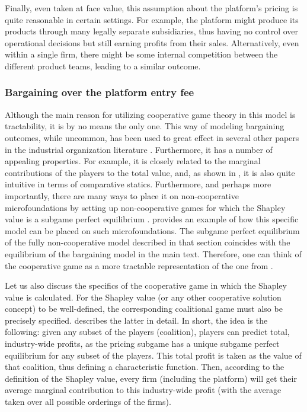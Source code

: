 Finally, even taken at face value, this assumption about the platform's pricing is quite reasonable in certain settings.
For example, the platform might produce its products through many legally separate subsidiaries, thus having no control over operational decisions but still earning profits from their sales.
Alternatively, even within a single firm, there might be some internal competition between the different product teams, leading to a similar outcome.

\subsubsection{Bargaining over the platform entry fee}

Although the main reason for utilizing cooperative game theory in this model is tractability, it is by no means the only one.
This way of modeling bargaining outcomes, while uncommon, has been used to great effect in several other papers in the industrial organization literature \parencite[e.g.][]{montez2007downstream,hart1990property,levy1997individual,inderst2003bargaining,brugemann2019intra}.
Furthermore, it has a number of appealing properties.
For example, it is closely related to the marginal contributions of the players to the total value, and, as shown in , it is also quite intuitive in terms of comparative statics.
Furthermore, and perhaps more importantly, there are many ways to place it on non-cooperative microfoundations by setting up non-cooperative games for which the Shapley value is a subgame perfect equilibrium \parencite[e.g.][]{gul1989bargaining,hart1996bargaining,stole1996organizational}.
 provides an example of how this specific model can be placed on such microfoundations.
The subgame perfect equilibrium of the fully non-cooperative model described in that section coincides with the equilibrium of the bargaining model in the main text.
Therefore, one can think of the cooperative game as a more tractable representation of the one from .

Let us also discuss the specifics of the cooperative game in which the Shapley value is calculated.
For the Shapley value (or any other cooperative solution concept) to be well-defined, the corresponding coalitional game must also be precisely specified.
 describes the latter in detail. 
In short, the idea is the following: given any subset of the players (coalition), players can predict total, industry-wide profits, as the pricing subgame has a unique subgame perfect equilibrium for any subset of the players.
This total profit is taken as the value of that coalition, thus defining a characteristic function.
Then, according to the definition of the Shapley value, every firm (including the platform) will get their average marginal contribution to this industry-wide profit (with the average taken over all possible orderings of the firms).

